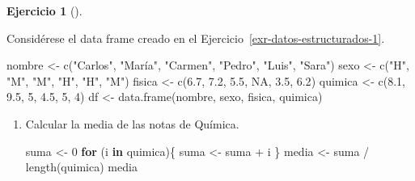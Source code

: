 \documentclass[
  spanish,
  a4paper,
]{scrreport}
\newenvironment{Shaded}{\begin{snugshade}}{\end{snugshade}}
\newcommand{\ConstantTok}[1]{\textcolor[rgb]{0.56,0.35,0.01}{#1}}
\newcommand{\ControlFlowTok}[1]{\textcolor[rgb]{0.00,0.23,0.31}{\textbf{#1}}}
\newcommand{\DecValTok}[1]{\textcolor[rgb]{0.68,0.00,0.00}{#1}}
\newcommand{\FloatTok}[1]{\textcolor[rgb]{0.68,0.00,0.00}{#1}}
\newcommand{\FunctionTok}[1]{\textcolor[rgb]{0.28,0.35,0.67}{#1}}
\newcommand{\NormalTok}[1]{\textcolor[rgb]{0.00,0.23,0.31}{#1}}
\newcommand{\OtherTok}[1]{\textcolor[rgb]{0.00,0.23,0.31}{#1}}
\newcommand{\SpecialCharTok}[1]{\textcolor[rgb]{0.37,0.37,0.37}{#1}}
\newcommand{\StringTok}[1]{\textcolor[rgb]{0.13,0.47,0.30}{#1}}
\theoremstyle{definition}
\newtheorem{exercise}{Ejercicio}[chapter]
\theoremstyle{definition}
\theoremstyle{remark}
\begin{document}
\begin{exercise}[]\protect\hypertarget{exr-estructuras-control-1}{}\label{exr-estructuras-control-1}

Considérese el data frame creado en el
Ejercicio~\ref{exr-datos-estructurados-1}.

\begin{Shaded}
\begin{Highlighting}[]
\NormalTok{nombre }\OtherTok{\textless{}{-}} \FunctionTok{c}\NormalTok{(}\StringTok{"Carlos"}\NormalTok{, }\StringTok{"María"}\NormalTok{, }\StringTok{"Carmen"}\NormalTok{, }\StringTok{"Pedro"}\NormalTok{, }\StringTok{"Luis"}\NormalTok{, }\StringTok{"Sara"}\NormalTok{)}
\NormalTok{sexo }\OtherTok{\textless{}{-}} \FunctionTok{c}\NormalTok{(}\StringTok{"H"}\NormalTok{, }\StringTok{"M"}\NormalTok{, }\StringTok{"M"}\NormalTok{, }\StringTok{"H"}\NormalTok{, }\StringTok{"H"}\NormalTok{, }\StringTok{"M"}\NormalTok{)}
\NormalTok{fisica }\OtherTok{\textless{}{-}} \FunctionTok{c}\NormalTok{(}\FloatTok{6.7}\NormalTok{, }\FloatTok{7.2}\NormalTok{, }\FloatTok{5.5}\NormalTok{, }\ConstantTok{NA}\NormalTok{, }\FloatTok{3.5}\NormalTok{, }\FloatTok{6.2}\NormalTok{)}
\NormalTok{quimica }\OtherTok{\textless{}{-}} \FunctionTok{c}\NormalTok{(}\FloatTok{8.1}\NormalTok{, }\FloatTok{9.5}\NormalTok{, }\DecValTok{5}\NormalTok{, }\FloatTok{4.5}\NormalTok{, }\DecValTok{5}\NormalTok{, }\DecValTok{4}\NormalTok{)}
\NormalTok{df }\OtherTok{\textless{}{-}} \FunctionTok{data.frame}\NormalTok{(nombre, sexo, fisica, quimica)}
\end{Highlighting}
\end{Shaded}

\begin{enumerate}
\def\labelenumi{\alph{enumi}.}
\item
  Calcular la media de las notas de Química.

  \begin{tcolorbox}[enhanced jigsaw, arc=.35mm, bottomrule=.15mm, bottomtitle=1mm, breakable, colback=white, colbacktitle=quarto-callout-note-color!10!white, colframe=quarto-callout-note-color-frame, coltitle=black, left=2mm, leftrule=.75mm, opacityback=0, opacitybacktitle=0.6, rightrule=.15mm, title=\textcolor{quarto-callout-note-color}{\faInfo}\hspace{0.5em}{Solución}, titlerule=0mm, toprule=.15mm, toptitle=1mm]

\begin{Shaded}
\begin{Highlighting}[]
\NormalTok{suma }\OtherTok{\textless{}{-}} \DecValTok{0}
\ControlFlowTok{for}\NormalTok{ (i }\ControlFlowTok{in}\NormalTok{ quimica)\{}
\NormalTok{  suma }\OtherTok{\textless{}{-}}\NormalTok{ suma }\SpecialCharTok{+}\NormalTok{ i}
\NormalTok{\}}
\NormalTok{media }\OtherTok{\textless{}{-}}\NormalTok{ suma }\SpecialCharTok{/} \FunctionTok{length}\NormalTok{(quimica)}
\NormalTok{media}
\end{Highlighting}
\end{Shaded}


\end{tcolorbox}
\end{enumerate}
\end{exercise}
\end{document}
